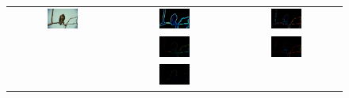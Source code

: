 \begin{figure}[ht!]
\begin{center}
  \begin{tabular}{ c c c }
  \includegraphics[width=0.3\textwidth]{images/experiments/SE_sPb-OWT-UCM/eagle.png} &
  \includegraphics[width=0.3\textwidth]{images/experiments/SE_sPb-OWT-UCM/eagle_SE-UCM_Pb_not_nms.png} &
  \includegraphics[width=0.3\textwidth]{images/experiments/SE_sPb-OWT-UCM/eagle_SE-UCM_ucm_imageSize.png} \\
  &
  \includegraphics[width=0.3\textwidth]{images/experiments/SE_sPb-OWT-UCM/eagle_gPb-OWT-UCM_gPb_thin.png} &
  \includegraphics[width=0.3\textwidth]{images/experiments/SE_sPb-OWT-UCM/eagle_gPb-OWT-UCM_ucm_imageSize.png} \\
  &
  \includegraphics[width=0.3\textwidth]{images/experiments/SE_sPb-OWT-UCM/eagle_(SE_sPb)-OWT-UCM_gPb_thin.png} &

\end{tabular}
\end{center}
\end{figure}
